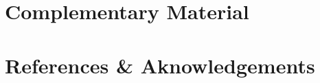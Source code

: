 \documentclass[handout,10pt]{beamer}
\begin{document}
\appendix
\section{Complementary Material}
	

\section{References \& Aknowledgements}
	
	

\end{document}

